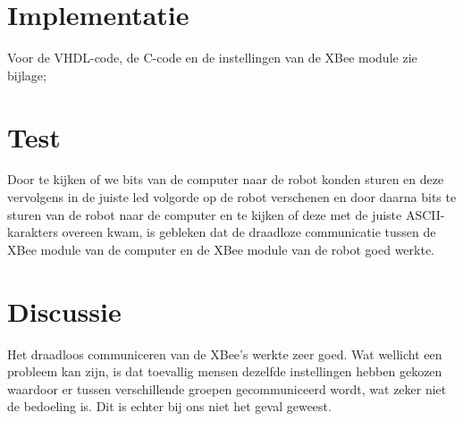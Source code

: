 \documentclass{report}
\begin{document}
\section{Implementatie}

Voor de VHDL-code, de C-code en de instellingen van de XBee module zie bijlage;

\section{Test}

Door te kijken of we bits van de computer naar de robot konden sturen en deze vervolgens in de juiste led volgorde op de robot verschenen en door daarna bits te sturen van de robot naar de computer en te kijken of deze met de juiste ASCII-karakters overeen kwam, is gebleken dat de draadloze communicatie tussen de XBee module van de computer en de XBee module van de robot goed werkte.

\section{Discussie}

Het draadloos communiceren van de XBee's werkte zeer goed. 
Wat wellicht een probleem kan zijn, is dat toevallig mensen dezelfde instellingen hebben gekozen waardoor er tussen verschillende groepen gecommuniceerd wordt, wat zeker niet de bedoeling is. Dit is echter bij ons niet het geval geweest.
\end{document}
